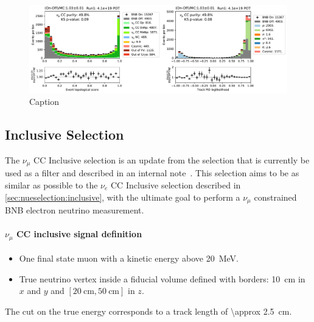 \begin{figure}
    \centering
    \includegraphics[width=\textwidth]{NuMuCCsel/Images/run1/numu_pret_run1.pdf}
    \caption{Caption}
    \label{fig:numu_topo_pid}
\end{figure}

\subsection{Inclusive Selection}
\label{ssec:NuMUCCsel:INC}
The $\nu_\mu$ CC Inclusive selection is an update from the selection that is currently be used as a filter and described in an internal note~\cite{bib:numuccfilter}. This selection aims to be as similar as possible to the $\nu_e$ CC Inclusive selection described in \cref{sec:nueselection:inclusive}, with the ultimate goal to perform a $\nu_\mu$ constrained BNB electron neutrino measurement. 

\paragraph{$\nu_\mu$ CC inclusive signal definition}
\begin{itemize}
    \item One final state muon with a kinetic energy above \SI{20}{\MeV}.
    \item True neutrino vertex inside a fiducial volume defined with borders: \SI{10}{\cm} in $x$ and $y$ and $[ \SI{20}{\cm}, \SI{50}{\cm}]$ in $z$.
\end{itemize}
The cut on the true energy corresponds to a track length of \SI{\approx 2.5}{\cm}.

